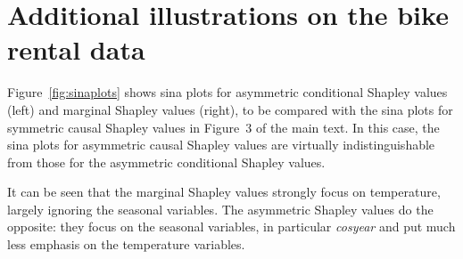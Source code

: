 \documentclass{article}
\begin{document}
\section{Additional illustrations on the bike rental data}

Figure~\ref{fig:sinaplots} shows sina plots for asymmetric conditional Shapley values (left) and marginal Shapley values (right), to be compared with the sina plots for symmetric causal Shapley values in Figure~3 of the main text. In this case, the sina plots for asymmetric causal Shapley values are virtually indistinguishable from those for the asymmetric conditional Shapley values.

It can be seen that the marginal Shapley values strongly focus on temperature, largely ignoring the seasonal variables. The asymmetric Shapley values do the opposite: they focus on the seasonal variables, in particular {\em cosyear} and put much less emphasis on the temperature variables.
\end{document}
